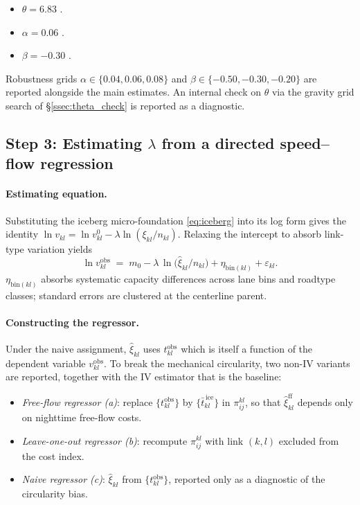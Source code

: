 \documentclass[12pt]{article}
\newcommand{\tbar}{\bar t}
\newcommand{\tkl}{t_{kl}}
\newcommand{\obs}{\mathrm{obs}}
\begin{document}
\begin{itemize}[leftmargin=2em,itemsep=0.2em]
\item $\theta=6.83$ \citep{Ahlfeldt2015}.
\item $\alpha=0.06$ \citep{CombesGobillon2015,CombesDurantonGobillon2008,AllenArkolakis2022}.
\item $\beta=-0.30$ \citep{AllenArkolakis2014,MonteReddingRossiHansberg2018,HeblichReddingSturm2020}.
\end{itemize}
Robustness grids $\alpha\in\{0.04,0.06,0.08\}$ and
$\beta\in\{-0.50,-0.30,-0.20\}$ are reported alongside the main
estimates.  An internal check on $\theta$ via the gravity grid
search of \S\ref{ssec:theta_check} is reported as a diagnostic.

\subsection{Step 3: Estimating $\lambda$ from a directed
speed--flow regression}\label{ssec:lambda_est}

\paragraph{Estimating equation.}
Substituting the iceberg micro-foundation \eqref{eq:iceberg} into
its log form gives the identity
$\ln v_{kl}=\ln v^{0}_{kl}-\lambda\ln(\xi_{kl}/n_{kl})$.  Relaxing
the intercept to absorb link-type variation yields
\begin{equation}
  \boxed{\;
  \ln v_{kl}^{\obs}
  \;=\;
  m_0
  -\lambda\,\ln\!\bigl(\hat\xi_{kl}/n_{kl}\bigr)
  +\eta_{\mathrm{bin}(kl)}
  +\varepsilon_{kl}.
  \;}
  \label{eq:lambda_regression}
\end{equation}
$\eta_{\mathrm{bin}(kl)}$ absorbs systematic capacity differences
across lane bins and roadtype classes; standard errors are clustered
at the centerline parent.

\paragraph{Constructing the regressor.}
Under the naive assignment, $\hat\xi_{kl}$ uses $\tkl^{\obs}$ which
is itself a function of the dependent variable $v_{kl}^{\obs}$.  To
break the mechanical circularity, two non-IV variants are reported,
together with the IV estimator that is the baseline:
\begin{itemize}[leftmargin=2em,itemsep=0.15em]
\item \emph{Free-flow regressor (a)}: replace $\{\tkl^{\obs}\}$ by
  $\{\tbar_{kl}^{\,\mathrm{ice}}\}$ in $\pi^{kl}_{ij}$, so that
  $\hat\xi_{kl}^{\mathrm{ff}}$ depends only on nighttime free-flow
  costs.
\item \emph{Leave-one-out regressor (b)}: recompute $\pi^{kl}_{ij}$
  with link $(k,l)$ excluded from the cost index.
\item \emph{Naive regressor (c)}: $\hat\xi_{kl}$ from
  $\{\tkl^{\obs}\}$, reported only as a diagnostic of the
  circularity bias.
\end{itemize}
\end{document}
